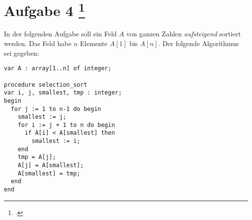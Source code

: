 \documentclass{bschlangaul-aufgabe}
\begin{document}
\section{Aufgabe 4
\footcite{examen:46115:2019:09}}

In der folgenden Aufgabe soll ein Feld $A$ von ganzen Zahlen
\emph{aufsteigend} sortiert werden. Das Feld habe $n$ Elemente $A[1]$
bis $A[n]$. Der folgende Algorithmus sei gegeben:

\begin{verbatim}
var A : array[1..n] of integer;

procedure selection_sort
var i, j, smallest, tmp : integer;
begin
  for j := 1 to n-1 do begin
    smallest := j;
    for i := j + 1 to n do begin
      if A[i] < A[smallest] then
        smallest := i;
    end
    tmp = A[j];
    A[j] = A[smallest];
    A[smallest] = tmp;
  end
end
\end{verbatim}
\end{document}
